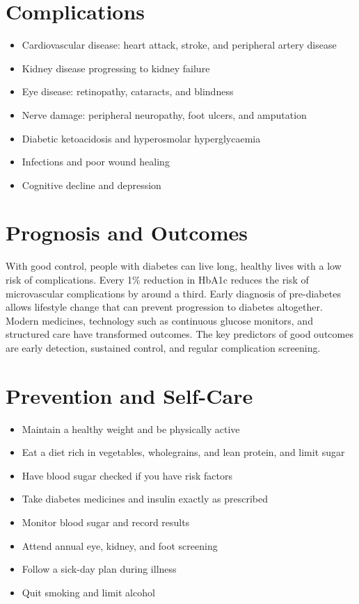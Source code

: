 \section*{Complications}
\begin{itemize}
    \item Cardiovascular disease: heart attack, stroke, and peripheral artery disease
    \item Kidney disease progressing to kidney failure
    \item Eye disease: retinopathy, cataracts, and blindness
    \item Nerve damage: peripheral neuropathy, foot ulcers, and amputation
    \item Diabetic ketoacidosis and hyperosmolar hyperglycaemia
    \item Infections and poor wound healing
    \item Cognitive decline and depression
\end{itemize}

\section*{Prognosis and Outcomes}
With good control, people with diabetes can live long, healthy lives with a low risk of complications. Every 1\% reduction in HbA1c reduces the risk of microvascular complications by around a third. Early diagnosis of pre-diabetes allows lifestyle change that can prevent progression to diabetes altogether. Modern medicines, technology such as continuous glucose monitors, and structured care have transformed outcomes. The key predictors of good outcomes are early detection, sustained control, and regular complication screening.

\section*{Prevention and Self-Care}
\begin{itemize}
    \item Maintain a healthy weight and be physically active
    \item Eat a diet rich in vegetables, wholegrains, and lean protein, and limit sugar
    \item Have blood sugar checked if you have risk factors
    \item Take diabetes medicines and insulin exactly as prescribed
    \item Monitor blood sugar and record results
    \item Attend annual eye, kidney, and foot screening
    \item Follow a sick-day plan during illness
    \item Quit smoking and limit alcohol
\end{itemize}

